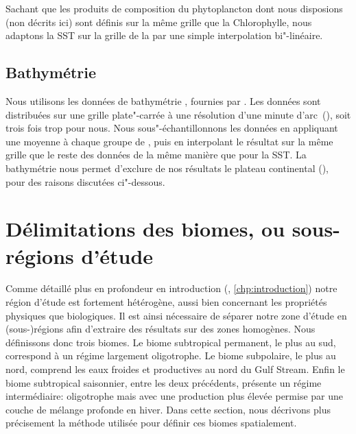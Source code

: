 Sachant que les produits de composition du phytoplancton dont nous disposions (non décrits ici) sont définis sur la même grille que la Chlorophylle, nous adaptons la SST sur la grille de la  par une simple interpolation bi"-linéaire.

\subsection{Bathymétrie}
\label{sec:donnees-bathymetrie}

Nous utilisons les données de bathymétrie , fournies par .
Les données sont distribuées sur une grille plate"-carrée à une résolution d'une minute d'arc~(), soit trois fois trop pour nous.
Nous sous"-échantillonnons les données en appliquant une moyenne à chaque groupe de , puis en interpolant le résultat sur la même grille que le reste des données de la même manière que pour la SST.
La bathymétrie nous permet d'exclure de nos résultats le plateau continental (), pour des raisons discutées ci"-dessous.

\begin{figure}
  \centering
  \label{fig:bathymetrie}
\end{figure}

\section{Délimitations des biomes, ou sous-régions d'étude}
\label{sec:delimitations-regions}

Comme détaillé plus en profondeur en introduction (, \cref*{chp:introduction}) notre région d'étude est fortement hétérogène, aussi bien concernant les propriétés physiques que biologiques.
Il est ainsi nécessaire de séparer notre zone d'étude en (sous-)régions afin d'extraire des résultats sur des zones homogènes.
Nous définissons donc trois biomes.
Le biome subtropical permanent, le plus au sud, correspond à un régime largement oligotrophe.
Le biome subpolaire, le plus au nord, comprend les eaux froides et productives au nord du Gulf Stream.
Enfin le biome subtropical saisonnier, entre les deux précédents, présente un régime intermédiaire: oligotrophe mais avec une production plus élevée permise par une couche de mélange profonde en hiver.
Dans cette section, nous décrivons plus précisement la méthode utilisée pour définir ces biomes spatialement.

